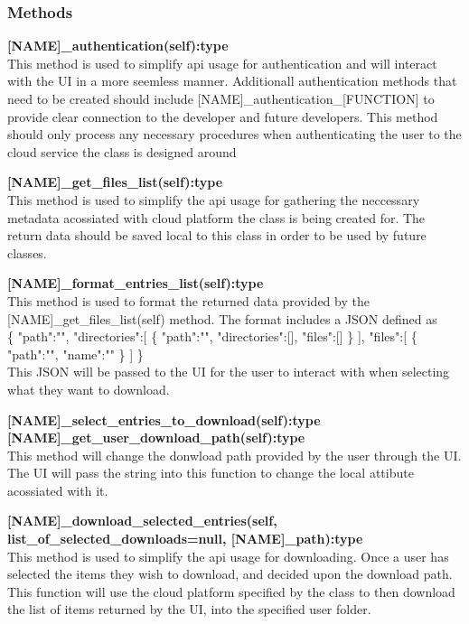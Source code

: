 \subsubsection{Methods}
\textbf{[NAME]\_authentication(self):type} \\
This method is used to simplify api usage for authentication and will interact with the UI in a more seemless manner. Additionall authentication
methods that need to be created should include [NAME]\_authentication\_[FUNCTION] to provide clear connection to the developer and future 
developers. This method should only process any necessary procedures when authenticating the user to the cloud service the class is designed around

\textbf{[NAME]\_get\_files\_list(self):type} \\
This method is used to simplify the api usage for gathering the neccessary metadata acossiated with cloud platform the class is being created for.
The return data should be saved local to this class in order to be used by future classes. 

\textbf{[NAME]\_format\_entries\_list(self):type} \\
This method is used to format the returned data provided by the [NAME]\_get\_files\_list(self) method. The format includes a JSON defined as 
\\
\{
   "path":"",
   "directories":[
      \{
         "path":"",
         "directories":[],
         "files":[]
      \}
   ],
   "files":[
      \{
         "path":"",
         "name":""
      \}
   ]
\}
\\
This JSON will be passed to the UI for the user to interact with when selecting what they want to download.

\textbf{[NAME]\_select\_entries\_to\_download(self):type} \\

\textbf{[NAME]\_get\_user\_download\_path(self):type} \\
This method will change the donwload path provided by the user through the UI. The UI will pass the string into this function to change the
local attibute acossiated with it.

\textbf{[NAME]\_download\_selected\_entries(self, list\_of\_selected\_downloads=null, [NAME]\_path):type} \\
​This method is used to simplify the api usage for downloading. Once a user has selected the items they wish to download, and decided upon the 
download path. This function will use the cloud platform specified by the class to then download the list of items returned by the UI, into the 
specified user folder.

